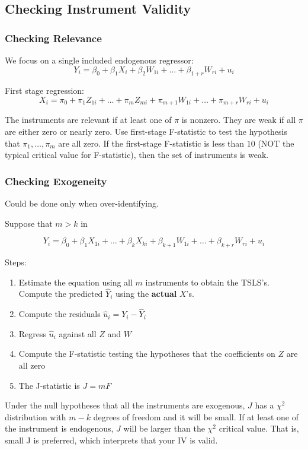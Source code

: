 \documentclass{article}
\begin{document}
\subsection{Checking Instrument Validity}

\subsubsection{Checking Relevance}

We focus on a single included endogenous regressor:
\[
	Y_i = \beta_0 + \beta_1 X_i + \beta_2 W_{1i} + \ldots + \beta_{1+r} W_{ri} + u_{i}
\]

First stage regression:
\[
	X_i = \pi_0 + \pi_1Z_{1i} + \ldots + \pi_m Z_{mi} + \pi_{m+1} W_{1i} + \ldots + \pi_{m+r} W_{ri} + u_i
\]

The instruments are relevant if at least one of $\pi$ is nonzero.
They are weak if all $\pi$ are either zero or nearly zero.
Use first-stage F-statistic to test the hypothesis that $\pi_1, \ldots, \pi_m$ are all zero.
If the first-stage F-statistic is less than $10$ (NOT the typical critical value for F-statistic), then the set of instruments is weak.

\subsubsection{Checking Exogeneity}

Could be done only when over-identifying.

Suppose that $m>k$ in

\[
	Y_i = \beta_0 + \beta_1 X_{1i} + \ldots + \beta_k X_{ki} + \beta_{k+1} W_{1i} + \ldots
	+ \beta_{k+r} W_{ri} + u_i
\]

Steps:
\begin{enumerate}
	\item Estimate the equation using all $m$ instruments to obtain the TSLS's.
					Compute the predicted $\hat{Y}_i$ using the \textbf{actual} $X$'s.
	\item Compute the residuals $\hat{u}_i = Y_i - \hat{Y}_i$
	\item Regress $\hat{u}_i$ against all $Z$ and $W$
	\item Compute the F-statistic testing the hypotheses that the coefficients on $Z$ are all zero
	\item The J-statistic is $J=mF$
\end{enumerate}

Under the null hypotheses that all the instruments are exogenous, $J$ has a $\chi^2$ distribution
with $m-k$ degrees of freedom and it will be small.
If at least one of the instrument is endogenous, $J$ will be larger than the $\chi^2$ critical value.
That is, small J is preferred, which interprets that your IV is valid.
\end{document}
